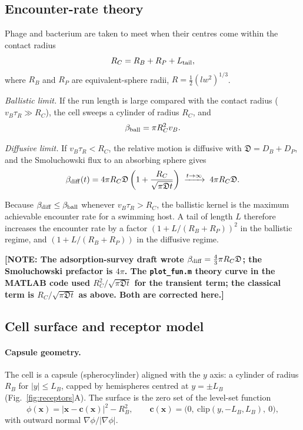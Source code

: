 \documentclass[12pt]{article}
\newcommand{\note}[1]{{\color{red}\textbf{[NOTE: #1]}}}
\begin{document}
\subsection*{Encounter-rate theory}
Phage and bacterium are taken to meet when their centres come within the contact radius
\begin{equation}\label{eq:Rc}
R_C=R_B+R_P+L_{\rm tail},
\end{equation}
where $R_B$ and $R_P$ are equivalent-sphere radii, $R=\tfrac12(lw^2)^{1/3}$.

\emph{Ballistic limit.} If the run length is large compared with the contact radius ($v_B\tau_R\gg R_C$), the cell sweeps a cylinder of radius $R_C$, and
\begin{equation}\label{eq:kball}
\beta_{\rm ball}=\pi R_C^{2}v_B .
\end{equation}

\emph{Diffusive limit.} If $v_B\tau_R<R_C$, the relative motion is diffusive with $\mathfrak D=D_B+D_P$, and the Smoluchowski flux to an absorbing sphere gives
\begin{equation}\label{eq:kdiff}
\beta_{\rm diff}(t)=4\pi R_C\mathfrak D\left(1+\frac{R_C}{\sqrt{\pi\mathfrak D t}}\right)\;\xrightarrow{t\to\infty}\;4\pi R_C\mathfrak D .
\end{equation}

Because $\beta_{\rm diff}\le\beta_{\rm ball}$ whenever $v_B\tau_R>R_C$, the ballistic kernel is the maximum achievable encounter rate for a swimming host\cite{visser2006plankton,joiner2019impact}. A tail of length $L$ therefore increases the encounter rate by a factor $(1+L/(R_B+R_P))^2$ in the ballistic regime, and $(1+L/(R_B+R_P))$ in the diffusive regime.

\note{The adsorption-survey draft wrote $\beta_{\rm diff}=\tfrac43\pi R_C\mathfrak D$; the Smoluchowski prefactor is $4\pi$. The \texttt{plot\_fun.m} theory curve in the MATLAB code used $R_C^2/\sqrt{\pi\mathfrak D t}$ for the transient term; the classical term is $R_C/\sqrt{\pi\mathfrak D t}$ as above. Both are corrected here.}

\subsection*{Cell surface and receptor model}
\paragraph{Capsule geometry.} The cell is a capsule (spherocylinder) aligned with the $y$ axis: a cylinder of radius $R_B$ for $|y|\le L_B$, capped by hemispheres centred at $y=\pm L_B$ (Fig.~\ref{fig:receptors}A). The surface is the zero set of the level-set function
\begin{equation}
\phi(\bm x)=|\bm x-\bm c(\bm x)|^2-R_B^2,\qquad \bm c(\bm x)=\big(0,\ \mathrm{clip}(y,-L_B,L_B),\ 0\big),
\end{equation}
with outward normal $\nabla\phi/|\nabla\phi|$.
\end{document}

